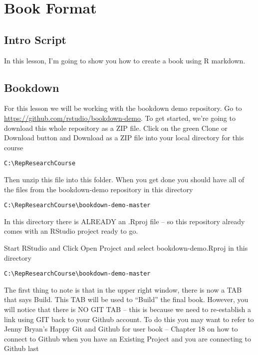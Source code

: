 \documentclass[
]{book}
\begin{document}
\hypertarget{books}{%
\chapter{Book Format}\label{books}}

\hypertarget{intro-script-1}{%
\section{Intro Script}\label{intro-script-1}}

In this lesson, I'm going to show you how to create a book using R markdown.

\hypertarget{bookdown}{%
\section{Bookdown}\label{bookdown}}

For this lesson we will be working with the bookdown demo repository. Go to \url{https://github.com/rstudio/bookdown-demo}. To get started, we're going to download this whole repository as a ZIP file. Click on the green Clone or Download button and Download as a ZIP file into your local directory for this course

\texttt{C:\textbackslash{}RepResearchCourse}

Then unzip this file into this folder. When you get done you should have all of the files from the bookdown-demo repository in this directory

\texttt{C:\textbackslash{}RepResearchCourse\textbackslash{}bookdown-demo-master}

In this directory there is ALREADY an .Rproj file -- so this repository already comes with an RStudio project ready to go.

Start RStudio and Click Open Project and select bookdown-demo.Rproj in this directory

\texttt{C:\textbackslash{}RepResearchCourse\textbackslash{}bookdown-demo-master}

The first thing to note is that in the upper right window, there is now a TAB that says Build. This TAB will be used to ``Build'' the final book. However, you will notice that there is NO GIT TAB -- this is because we need to re-establish a link using GIT back to your Github account. To do this you may want to refer to Jenny Bryan's Happy Git and Github for user book -- Chapter 18 on how to connect to Github when you have an Existing Project and you are connecting to Github last
\end{document}
